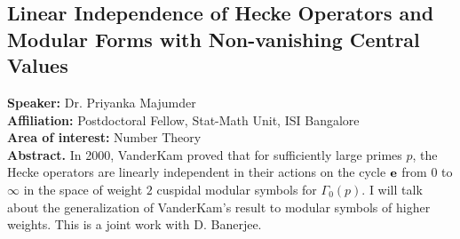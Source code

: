 \subsection*{Linear Independence of Hecke Operators and Modular Forms with Non-vanishing Central Values}
\noindent
\textbf{Speaker:} Dr. Priyanka Majumder \\ %
\textbf{Affiliation:} Postdoctoral Fellow, Stat-Math Unit, ISI Bangalore \\ %
\textbf{Area of interest:} Number Theory \\

\noindent\textbf{Abstract.} In 2000, VanderKam proved that for sufficiently large primes $p$, the Hecke operators are linearly independent in their actions on the cycle $\bold{e}$ from $0$ to $\infty$ in the space of weight $2$ cuspidal modular symbols for $\Gamma_0(p)$. I will talk about the generalization of VanderKam's result to modular symbols of higher weights. This is a joint work with D. Banerjee. 
